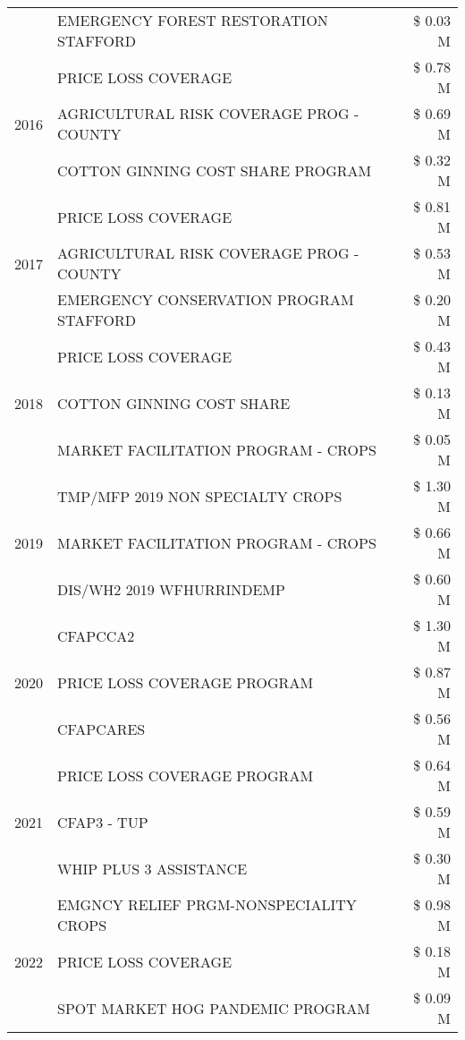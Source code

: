 \begin{tabular}{llr}
 & EMERGENCY FOREST RESTORATION STAFFORD & \$ 0.03 M \\
\cline{1-3}
\multirow[t]{3}{*}{2016} & PRICE LOSS COVERAGE & \$ 0.78 M \\
 & AGRICULTURAL RISK COVERAGE PROG - COUNTY & \$ 0.69 M \\
 & COTTON GINNING COST SHARE PROGRAM & \$ 0.32 M \\
\cline{1-3}
\multirow[t]{3}{*}{2017} & PRICE LOSS COVERAGE & \$ 0.81 M \\
 & AGRICULTURAL RISK COVERAGE PROG - COUNTY & \$ 0.53 M \\
 & EMERGENCY CONSERVATION PROGRAM STAFFORD & \$ 0.20 M \\
\cline{1-3}
\multirow[t]{3}{*}{2018} & PRICE LOSS COVERAGE & \$ 0.43 M \\
 & COTTON GINNING COST SHARE & \$ 0.13 M \\
 & MARKET FACILITATION PROGRAM - CROPS & \$ 0.05 M \\
\cline{1-3}
\multirow[t]{3}{*}{2019} & TMP/MFP 2019 NON SPECIALTY CROPS & \$ 1.30 M \\
 & MARKET FACILITATION PROGRAM - CROPS & \$ 0.66 M \\
 & DIS/WH2 2019 WFHURRINDEMP & \$ 0.60 M \\
\cline{1-3}
\multirow[t]{3}{*}{2020} & CFAPCCA2 & \$ 1.30 M \\
 & PRICE LOSS COVERAGE PROGRAM & \$ 0.87 M \\
 & CFAPCARES & \$ 0.56 M \\
\cline{1-3}
\multirow[t]{3}{*}{2021} & PRICE LOSS COVERAGE PROGRAM & \$ 0.64 M \\
 & CFAP3 - TUP & \$ 0.59 M \\
 & WHIP PLUS 3 ASSISTANCE & \$ 0.30 M \\
\cline{1-3}
\multirow[t]{3}{*}{2022} & EMGNCY RELIEF PRGM-NONSPECIALITY CROPS & \$ 0.98 M \\
 & PRICE LOSS COVERAGE & \$ 0.18 M \\
 & SPOT MARKET HOG PANDEMIC PROGRAM & \$ 0.09 M \\
\cline{1-3}
\bottomrule
\end{tabular}
